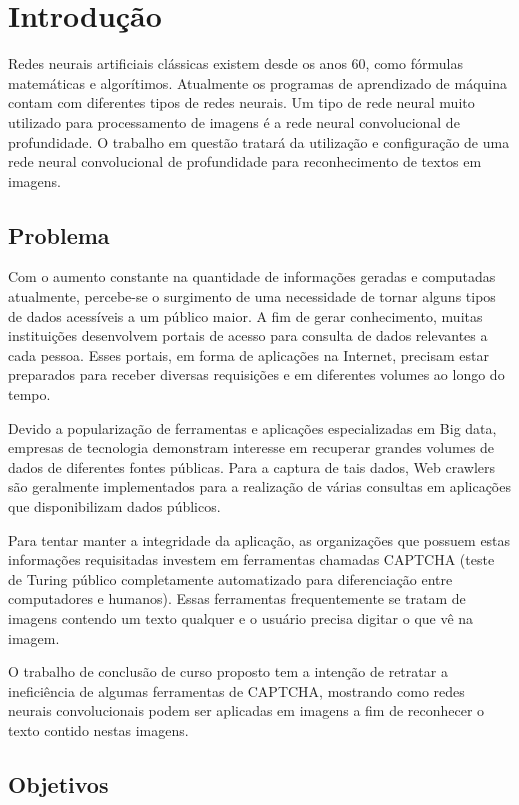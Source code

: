 \chapter{Introdução}

Redes neurais artificiais clássicas existem desde os anos 60, como fórmulas  
matemáticas e algorítimos. Atualmente os programas de aprendizado de máquina  
contam com diferentes tipos de redes neurais. Um tipo de rede neural muito  
utilizado para processamento de imagens é a rede neural convolucional de  
profundidade. O trabalho em questão tratará da utilização e
configuração de uma rede neural convolucional de profundidade para
reconhecimento de textos em imagens.

\section{Problema}

Com o aumento constante na quantidade de informações geradas e 
computadas atualmente, percebe-se o surgimento de uma necessidade de tornar
alguns tipos de dados acessíveis a um público maior. A fim de gerar
conhecimento, muitas instituições desenvolvem portais de acesso para
consulta de dados relevantes a cada pessoa. Esses portais, em forma de
aplicações na Internet, precisam estar preparados para receber
diversas requisições e em diferentes volumes ao longo do tempo.

Devido a popularização de ferramentas e aplicações especializadas em Big
data, empresas de tecnologia demonstram interesse em recuperar grandes
volumes de dados de diferentes fontes públicas. Para a captura de tais
dados, Web crawlers são geralmente implementados para a realização de
várias consultas em aplicações que disponibilizam dados públicos.

Para tentar manter a integridade da aplicação, as organizações que possuem  
estas informações requisitadas investem em ferramentas chamadas CAPTCHA  
(teste de Turing público completamente automatizado para diferenciação entre  
computadores e humanos). Essas ferramentas frequentemente se tratam de  
imagens contendo um texto qualquer e o usuário precisa digitar o que vê na  
imagem. 

O trabalho de conclusão de curso proposto tem a intenção de retratar a  
ineficiência de algumas ferramentas de CAPTCHA, mostrando como redes neurais  
convolucionais podem ser aplicadas em imagens a fim de reconhecer o texto  
contido nestas imagens. 

\section{Objetivos}

